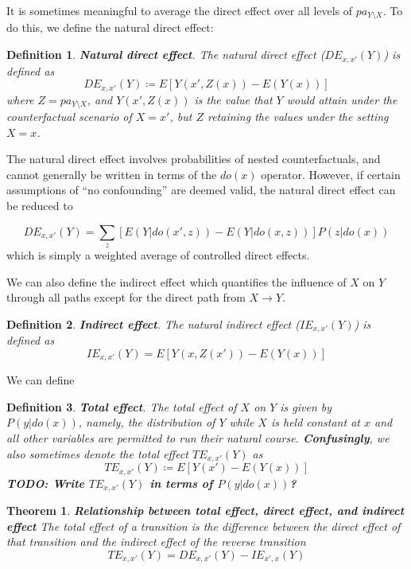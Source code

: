 \documentclass[11pt]{article}
\numberwithin{equation}{section}
\newcommand{\defeq}{\coloneqq}
\newtheorem{thm}{Theorem}[section]
\newtheorem{defn}{Definition}[section]
\begin{document}
It is sometimes meaningful to average the direct effect over all levels of $pa_{Y\setminus X}$. To do this, we define the natural direct effect:

\begin{defn}
\textbf{Natural direct effect}. The natural direct effect ($DE_{x,x'}(Y)$) is defined as
\begin{equation}
DE_{x,x'}(Y) \defeq E[Y(x', Z(x)) - E(Y(x))]
\end{equation}
where $Z= pa_{Y\setminus X}$, and $Y(x', Z(x))$ is the value that $Y$ would attain under the counterfactual scenario of $X=x'$, but $Z$ retaining the values under the setting $X=x$.
\end{defn}

The natural direct effect involves probabilities of nested counterfactuals, and cannot generally be written in terms of the $do(x)$ operator. However, if certain assumptions of ``no confounding'' are deemed valid, the natural direct effect can be reduced to 

\begin{equation}
DE_{x,x'}(Y) = \sum_z [E(Y|do(x', z)) - E(Y| do(x,z))]P(z|do(x))
\end{equation}
which is simply a weighted average of controlled direct effects. 

We can also define the indirect effect which quantifies the influence of $X$ on $Y$ through all paths except for the direct path from $X \rightarrow Y$.
\begin{defn}
\textbf{Indirect effect}. The natural indirect effect ($IE_{x,x'}(Y)$) is defined as
\begin{equation}
IE_{x,x'}(Y) = E[Y(x, Z(x')) - E(Y(x))]
\end{equation}
\end{defn}
We can define 
\begin{defn}
\textbf{Total effect}. The total effect of $X$ on $Y$ is given by $P(y|do(x))$, namely, the distribution of $Y$ while $X$ is held constant at $x$ and all other variables are permitted to run their natural course.  \textbf{Confusingly}, we also sometimes denote the total effect $TE_{x,x'}(Y)$ as 
\begin{equation}
TE_{x,x'}(Y) \defeq E[Y(x') - E(Y(x))] 
\end{equation}
\textbf{TODO: Write $TE_{x,x'}(Y)$ in terms of $P(y|do(x))$?}
\end{defn}

\begin{thm}
\textbf{Relationship between total effect, direct effect, and indirect effect} The total effect of a transition is the \textit{difference} between the direct effect of that transition and the indirect effect of the reverse transition
\begin{equation}
TE_{x,x'}(Y) = DE_{x,x'}(Y) - IE_{x',x}(Y)
\end{equation}
\end{thm}
\end{document}
